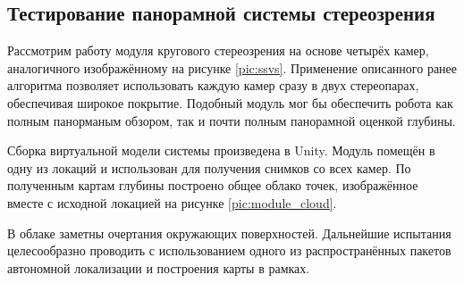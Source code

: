 \subsection{Тестирование панорамной системы стереозрения}

Рассмотрим работу модуля кругового стереозрения на основе четырёх камер, аналогичного 
изображённому на рисунке \ref{pic:ssvs}. Применение описанного ранее алгоритма позволяет
использовать каждую камер сразу в двух стереопарах, обеспечивая широкое покрытие.
Подобный модуль мог бы обеспечить робота как полным панорманым обзором, так и почти полным панорамной оценкой глубины. 

Сборка виртуальной модели системы произведена в Unity. Модуль помещён в одну из локаций 
и использован для получения снимков со всех камер. По полученным картам глубины построено
общее облако точек, изображённое вместе с исходной локацией на рисунке \ref{pic:module_cloud}. 


В облаке заметны очертания окружающих поверхностей. Дальнейшие испытания целесообразно проводить 
с использованием одного из распространённых пакетов автономной локализации и построения карты в рамках.
